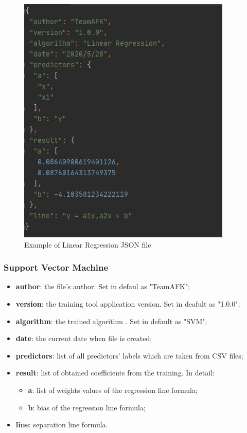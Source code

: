 		\begin{figure}[H]
		\centering
		\includegraphics[scale=0.70]{../Developer_manual/img/linear_regression_json.JPG}
		\caption{Example of Linear Regression JSON file}
	\end{figure}	
	
		\subsubsection{Support Vector Machine}
		\begin{itemize}
			\item\textbf{author}: the file's author. Set in defaul as "TeamAFK";
			\item\textbf{version}: the training tool application version. Set in deafult as "1.0.0";
			\item\textbf{algorithm}: the trained algorithm . Set in default as "SVM"; 	
			\item\textbf{date}: the current date when file is created;
			\item\textbf{predictors}: list of all predictors' labels which are taken from CSV files;
			\item\textbf{result}: list of obtained coefficients from the training. In detail:
				\begin{itemize}
					\item\textbf{a}: list of weights values of the regression line formula;
					\item\textbf{b}: bias of the regression line formula;
				\end{itemize}
			\item\textbf{line}: separation line formula.
					
		\end{itemize}
		
